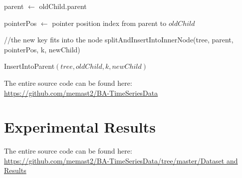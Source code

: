 \documentclass[abstracton,12pt,oneside]{scrreprt}
\begin{document}
\begin{algorithm}[H]
	\IncMargin{1em}
	\SetAlgoLined
	\DontPrintSemicolon
	
	
	
	parent $\leftarrow$ oldChild.parent\;
	
	
	pointerPos $\leftarrow$ pointer position index from parent to $oldChild$\;
	
	//the new key fits into the node\;
	{
		splitAndInsertIntoInnerNode(tree, parent, pointerPos, k, newChild)\;
	}
	
	
	\caption{InsertIntoParent$(tree, oldChild, k, newChild)$}	\label{InsertIntoParent}
\end{algorithm}


\BlankLine
The entire source code can be found here: \\
\url{https://github.com/memast2/BA-TimeSeriesData}


\chapter{Experimental Results}
The entire source code can be found here: \\
\url{https://github.com/memast2/BA-TimeSeriesData/tree/master/Dataset and Results}
\end{document}
